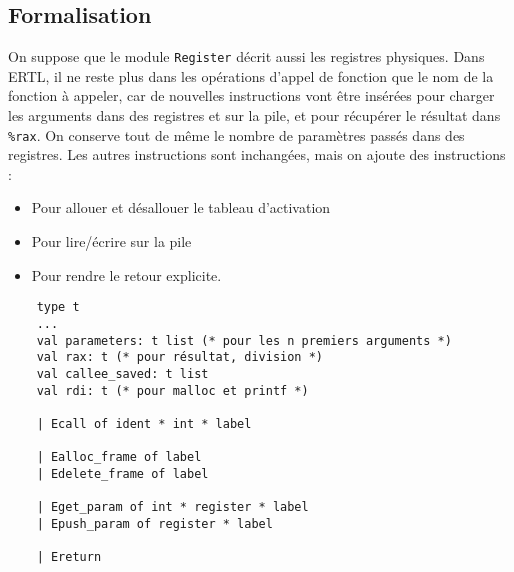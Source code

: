 \documentclass{cours}
\begin{document}
\subsection{Formalisation}
On suppose que le module \texttt{Register} décrit aussi les registres physiques. Dans ERTL, il ne reste plus dans les opérations d'appel de fonction que le nom de la fonction à appeler, car de nouvelles instructions vont être insérées pour charger les arguments dans des registres et sur la pile, et pour récupérer le résultat dans \texttt{\%rax}. On conserve tout de même le nombre de paramètres passés dans des registres. Les autres instructions sont inchangées, mais on ajoute des instructions :
\begin{itemize}
    \item Pour allouer et désallouer le tableau d'activation
    \item Pour lire/écrire sur la pile
    \item Pour rendre le retour explicite.
\end{itemize}
\begin{verbatim}
    type t
    ...
    val parameters: t list (* pour les n premiers arguments *)
    val rax: t (* pour résultat, division *)
    val callee_saved: t list
    val rdi: t (* pour malloc et printf *)

    | Ecall of ident * int * label

    | Ealloc_frame of label
    | Edelete_frame of label

    | Eget_param of int * register * label
    | Epush_param of register * label

    | Ereturn
\end{verbatim}
\end{document}
